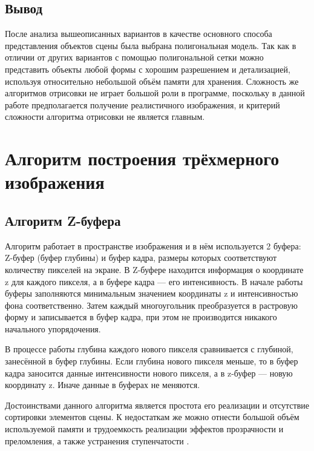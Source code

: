 \subsection*{Вывод}
После анализа вышеописанных вариантов в качестве основного способа представления объектов сцены была выбрана полигональная модель. Так как в отличии от других вариантов с помощью полигональной сетки можно представить объекты любой формы с хорошим разрешением и детализацией, используя относительно небольшой объём памяти для хранения. Сложность же алгоритмов отрисовки не играет большой роли в программе, поскольку в данной работе предполагается получение реалистичного изображения, и критерий сложности алгоритма отрисовки не является главным.

\section{Алгоритм построения трёхмерного изображения}

\subsection{Алгоритм Z-буфера}

Алгоритм работает в пространстве изображения и в нём используется 2 буфера: Z-буфер (буфер глубины) и буфер кадра, размеры которых соответствуют количеству пикселей на экране. В Z-буфере находится информация о координате z для каждого пикселя, а в буфере кадра --- его интенсивность. В начале работы буферы заполняются минимальным значением координаты z и интенсивностью фона соответственно. Затем каждый многоугольник преобразуется в растровую форму и записывается в буфер кадра, при этом не производится никакого начального упорядочения.


В процессе работы глубина каждого нового пикселя сравнивается с глубиной, занесённой в буфер глубины. Если глубина нового пикселя меньше, то в буфер кадра заносится данные интенсивности нового пикселя, а в z-буфер --- новую координату z. Иначе данные в буферах не меняются.

Достоинствами данного алгоритма является простота его реализации и отсутствие сортировки элементов сцены. К недостаткам же можно отнести большой объём используемой памяти и трудоемкость реализации эффектов прозрачности и преломления, а также устранения ступенчатости \cite{rodgers}.

